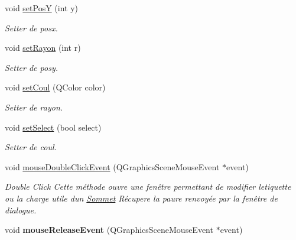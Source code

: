 \begin{DoxyCompactItemize}
void \hyperlink{classQSommet_a3bb132d2ea4cf072eb57fc523dfe81e3}{set\+PosY} (int y)
\begin{DoxyCompactList}\small\item\em Setter de posx. \end{DoxyCompactList}\item 
\mbox{\label{classQSommet_a24050e3c87bcada74429c14ce8618819}} 
void \hyperlink{classQSommet_a24050e3c87bcada74429c14ce8618819}{set\+Rayon} (int r)
\begin{DoxyCompactList}\small\item\em Setter de posy. \end{DoxyCompactList}\item 
\mbox{\label{classQSommet_a767043c2b80b30f86b7c197d21894113}} 
void \hyperlink{classQSommet_a767043c2b80b30f86b7c197d21894113}{set\+Coul} (Q\+Color color)
\begin{DoxyCompactList}\small\item\em Setter de rayon. \end{DoxyCompactList}\item 
void \hyperlink{classQSommet_aa56de028e560f437fa2d42b57f08602b}{set\+Select} (bool select)
\begin{DoxyCompactList}\small\item\em Setter de coul. \end{DoxyCompactList}\item 
\mbox{\label{classQSommet_aa35b9d8c8acdda4fa6747fbd97b549fe}} 
void \hyperlink{classQSommet_aa35b9d8c8acdda4fa6747fbd97b549fe}{mouse\+Double\+Click\+Event} (Q\+Graphics\+Scene\+Mouse\+Event $\ast$event)
\begin{DoxyCompactList}\small\item\em Double Click Cette m\'{e}thode ouvre une fen\^{e}tre permettant de modifier l\textquotesingle{}etiquette ou la charge utile d\textquotesingle{}un \hyperlink{classSommet}{Sommet} R\'{e}cupere la paure renvoy\'{e}e par la fen\^{e}tre de dialogue. \end{DoxyCompactList}\item 
\mbox{\label{classQSommet_a7ac1fa770f90251e5d2926fc69a5ba7e}} 
void {\bfseries mouse\+Release\+Event} (Q\+Graphics\+Scene\+Mouse\+Event $\ast$event)
\item 
\mbox{\label{classQSommet_a17d6341ca386c11f916830bcfab85f3d}} 

\end{DoxyCompactItemize}
